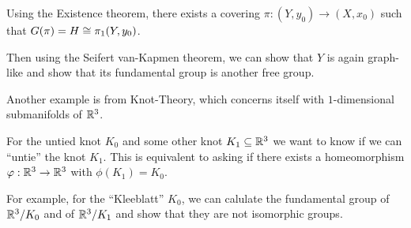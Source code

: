 Using the Existence theorem, there exists a covering $\pi:(Y,y_0) \to  (X,x_0)$ such that $G(\pi) = H \cong \pi_1(Y,y_0)$.

Then using the Seifert van-Kapmen theorem, we can show that $Y$ is again graph-like and show that its fundamental group is another free group.

Another example is from Knot-Theory, which concerns itself with $1$-dimensional submanifolds of $\mathbb{R}^{3}$.

For the untied knot $K_0$ and some other knot $K_1 \subseteq \mathbb{R}^{3}$ we want to know if we can ``untie'' the knot $K_1$.
This is equivalent to asking if there exists a homeomorphism $\varphi:\mathbb{R}^{3} \to \mathbb{R}^{3}$ with $\phi(K_1) = K_0$.

For example, for the ``Kleeblatt'' $K_0$, we can calulate the fundamental group of $\mathbb{R}^{3}/K_0$ and of $\mathbb{R}^{3}/K_1$ and show that they are not isomorphic groups.


